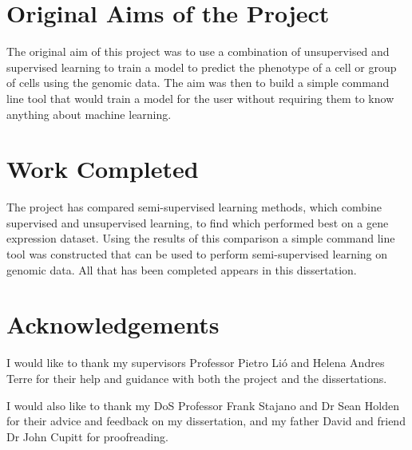 \documentclass[12pt,a4paper,twoside,openany]{report}
\begin{document}
\section*{Original Aims of the Project}

The original aim of this project was to use a combination of unsupervised and supervised learning 
to train a model to predict the phenotype of a cell or group of cells using the genomic data.
The aim was then to build a simple command line tool that would train a model for the user without requiring them 
to know anything about machine learning.

\section*{Work Completed}

The project has compared semi-supervised learning methods, which combine supervised and unsupervised learning,
to find which performed best on a gene expression dataset. Using the results of this comparison
a simple command line tool was constructed that can be used to perform semi-supervised learning on genomic data.
All that has been completed appears in this dissertation.

\tableofcontents

\listoffigures

\newpage
\section*{Acknowledgements}

I would like to thank my supervisors Professor Pietro Li\'o and Helena Andres Terre for their help and guidance with both the project and the dissertations.

I would also like to thank my DoS Professor Frank Stajano and Dr Sean Holden for their advice and feedback on my dissertation,
and my father David and friend Dr John Cupitt for proofreading. 


\pagestyle{headings}











\printbibliography


\end{document}
